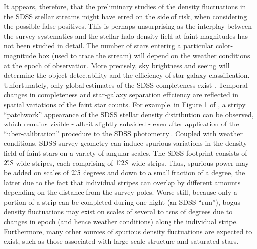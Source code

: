 \documentclass[useAMS,usenatbib]{mn2e}
\begin{document}
It appears, therefore, that the preliminary studies of the density
fluctuations in the SDSS stellar streams might have erred on the side
of risk, when considering the possible false positives. This is
perhaps unsurprising as the interplay between the survey systematics
and the stellar halo density field at faint magnitudes has not been
studied in detail. The number of stars entering a particular
color-magnitude box (used to trace the stream) will depend on the
weather conditions at the epoch of observation. More precisely, sky
brightness and seeing will determine the object detectability and the
efficiency of star-galaxy classification. Unfortunately, only global
estimates of the SDSS completeness exist \citep[see
  e.g.][]{sdss_edr,sdss_dr2}. Temporal changes in completeness and
star-galaxy separation efficiency are reflected in spatial variations
of the faint star counts. For example, in Figure 1 of
\citet{koposov_2012}, a stripy ``patchwork'' appearance of the SDSS
stellar density distribution can be observed, which remains visible -
albeit slightly subsided - even after application of
the ``uber-calibration'' procedure to the SDSS photometry
\citep[][]{sdss_ubercal}. Coupled with weather conditions, SDSS survey
geometry can induce spurious variations in the density field of faint
stars on a variety of angular scales. The SDSS footprint consists of
$2 \hbox{$.\!\!^\circ$} 5$-wide stripes, each comprising of $1 \hbox{$.\!\!^\circ$} 25$-wide
strips. Thus, spurious power may be added on scales of $2 \hbox{$.\!\!^\circ$} 5$
degrees and down to a small fraction of a degree, the latter due to
the fact that individual stripes can overlap by different amounts 
depending on the distance from the survey poles. Worse still, because
only a portion of a strip can be completed during one night (an SDSS
``run''), bogus density fluctuations may exist on scales of several to
tens of degrees due to changes in epoch (and hence weather conditions)
along the individual stripe. Furthermore, many other sources of
spurious density fluctuations are expected to exist, such as those
associated with large scale structure and saturated stars.
\end{document}
